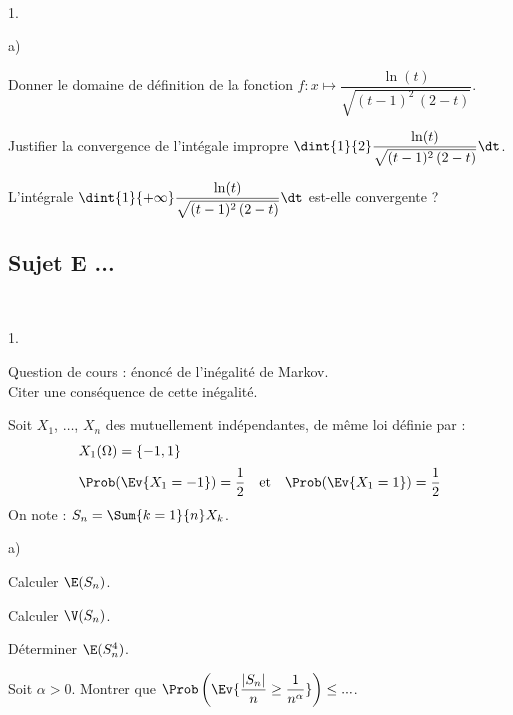 \documentclass[11pt]{article}%
\begin{document}
\begin{exerciceSP}~
  \begin{noliste}{1.}
    \setlength{\itemsep}{2mm}
  \item
    \begin{noliste}{a)}
      \setlength{\itemsep}{2mm}
    \item Donner le domaine de définition de la fonction $f : x
      \mapsto \dfrac{\ln(t)}{\sqrt{ (t-1)^2 \, (2-t)}}$.
      
    \item Justifier la convergence de l'intégale impropre $\dint{1}{2}
      \dfrac{\ln(t)}{\sqrt{ (t-1)^2 \, (2-t)}} \dt$.
    \end{noliste}
    
  \item L'intégrale $\dint{1}{+\infty} \dfrac{\ln(t)}{\sqrt{ (t-1)^2
        \, (2-t)}} \dt$ est-elle convergente ?
  \end{noliste}
\end{exerciceSP}


\newpage


\subsection*{Sujet E ...}

\begin{exerciceAP}~
  \begin{noliste}{1.}
    \setlength{\itemsep}{2mm}
    \item Question de cours : énoncé de l'inégalité de Markov.\\
    Citer une conséquence de cette inégalité.
    
    \item Soit $X_1$, $\ldots$, $X_n$ des \var mutuellement 
    indépendantes, de même loi définie par :
    \[
      \begin{array}{l}
        X_1(\Omega) = \{-1,1\} \\[.2cm]
        \Prob(\Ev{X_1 = -1}) = \dfrac{1}{2} \quad \text{et} \quad
        \Prob(\Ev{X_1=1}) = \dfrac{1}{2}
      \end{array}
    \]
    On note : $S_n = \Sum{k=1}{n} X_k$.
    \begin{noliste}{a)}
      \setlength{\itemsep}{2mm}
      \item Calculer $\E(S_n)$.
      
      \item Calculer $\V(S_n)$.
    \end{noliste}
    
    \item Déterminer $\E(S_n^4)$.
    
    \item Soit $\alpha >0$.
    Montrer que $\Prob\left(\Ev{ \dfrac{\vert S_n \vert}{n} \geq 
    \dfrac{1}{n^\alpha}}\right) \leq ...$.
  \end{noliste}
\end{exerciceAP}
\end{document}
